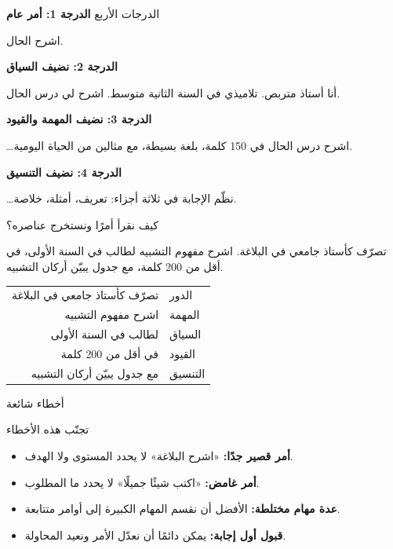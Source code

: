 \documentclass[aspectratio=169, 11pt, xcolor={table}]{beamer}
\begin{document}
\begin{frame}{الدرجات الأربع}
    \small
    \textbf{\color{brandOrange}الدرجة 1: أمر عام}
    \begin{amr}[brandOrange]
        اشرح الحال.
    \end{amr}
    \textbf{\color{tealDeep}الدرجة 2: نضيف السياق}
    \begin{amr}[brandTeal!45]
        أنا أستاذ متربص. تلاميذي في السنة الثانية متوسط. اشرح لي درس الحال.
    \end{amr}
    \textbf{\color{tealDeep}الدرجة 3: نضيف المهمة والقيود}
    \begin{amr}[brandTeal!70]
        \dots اشرح درس الحال في 150 كلمة، بلغة بسيطة، مع مثالين من الحياة اليومية.
    \end{amr}
    \textbf{\color{tealDeep}الدرجة 4: نضيف التنسيق}
    \begin{amr}[brandTeal]
        \dots نظّم الإجابة في ثلاثة أجزاء: تعريف، أمثلة، خلاصة.
    \end{amr}
\end{frame}

\begin{frame}{كيف نقرأ أمرًا ونستخرج عناصره؟}
    \begin{amr}[brandTeal]
        تصرّف كأستاذ جامعي في البلاغة. اشرح مفهوم التشبيه لطالب في السنة الأولى،
        في أقل من 200 كلمة، مع جدول يبيّن أركان التشبيه.
    \end{amr}
    \begin{center}
    \begin{tabularx}{0.75\textwidth}{|R|>{\centering\arraybackslash}p{2.5cm}|}
        \hline
         &  \\ \hline
        تصرّف كأستاذ جامعي في البلاغة & الدور \\ \hline
        اشرح مفهوم التشبيه            & المهمة \\ \hline
        لطالب في السنة الأولى         & السياق \\ \hline
        في أقل من 200 كلمة            & القيود \\ \hline
        مع جدول يبيّن أركان التشبيه   & التنسيق \\ \hline
    \end{tabularx}
    \end{center}
\end{frame}

\begin{frame}{أخطاء شائعة}
    \begin{obox}{\faExclamationTriangle\quad تجنّب هذه الأخطاء}
        \begin{itemize}
            \item \textbf{أمر قصير جدًا:} «اشرح البلاغة» لا يحدد المستوى ولا الهدف.
            \item \textbf{أمر غامض:} «اكتب شيئًا جميلًا» لا يحدد ما المطلوب.
            \item \textbf{عدة مهام مختلطة:} الأفضل أن نقسم المهام الكبيرة إلى أوامر متتابعة.
            \item \textbf{قبول أول إجابة:} يمكن دائمًا أن نعدّل الأمر ونعيد المحاولة.
        \end{itemize}
    \end{obox}
\end{frame}
\end{document}
